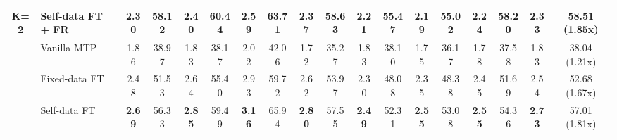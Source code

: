 \documentclass{article} %
\begin{document}
\begin{table}[ht]
\begin{adjustbox}{width=\textwidth}
\begin{tabular}{clcccccccccccccccc}
\multirow{-4}{*}{K=2}             & Self-data FT + FR                         & 2.30                         & 58.12                                  & 2.40                         & 60.44                                  & 2.59                         & 63.71                                  & 2.37                         & 58.63                                  & 2.21                         & 55.47                                  & 2.19                         & 55.02                                  & 2.24                         & 58.20                                  & 2.33                         & 58.51 (1.85x)                                  \\ \midrule
                                  & Vanilla MTP                                   & 1.86                         & 38.97                                  & 1.83                         & 38.17                                  & 2.02                         & 42.06                                  & 1.72                         & 35.27                                  & 1.83                         & 38.10                                  & 1.75                         & 36.17                                  & 1.78                         & 37.58                                  & 1.83                         & 38.04 (1.21x)                                  \\
                                  & Fixed-data FT                             & 2.48                         & 51.53                                  & 2.64                         & 55.40                                  & 2.93                         & 59.72                                  & 2.62                         & 53.97                                  & 2.30                         & 48.08                                  & 2.35                         & 48.38                                  & 2.45                         & 51.69                                  & 2.54                         & 52.68 (1.67x)                                  \\
                                  & Self-data FT                              & \textbf{2.69}                & 56.33                                  & \textbf{2.85}                & 59.49                                  & \textbf{3.16}                & 65.94                                  & \textbf{2.80}                & 57.55                                  & \textbf{2.49}                & 52.31                                  & \textbf{2.55}                & 53.08                                  & \textbf{2.55}                & 54.36                                  & \textbf{2.73}                & 57.01 (1.81x)                                  \\

\end{tabular}
\end{adjustbox}
\end{table}
\end{document}
